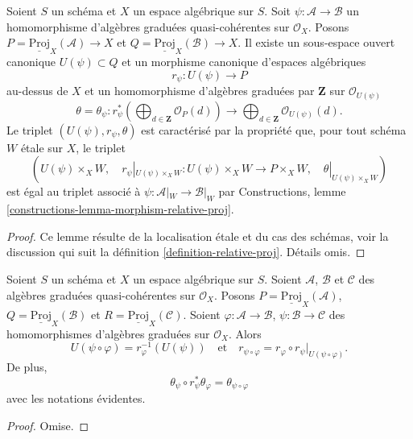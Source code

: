 \begin{lemma}
\label{lemma-morphism-relative-proj}
Soient $S$ un schéma et $X$ un espace algébrique sur $S$.
Soit $\psi : \mathcal{A} \to \mathcal{B}$ un homomorphisme
d'algèbres graduées quasi-cohérentes sur $\mathcal{O}_X$. Posons
$P = \underline{\text{Proj}}_X(\mathcal{A}) \to X$ et
$Q = \underline{\text{Proj}}_X(\mathcal{B}) \to X$.
Il existe un sous-espace ouvert canonique
$U(\psi) \subset Q$ et un morphisme canonique
d'espaces algébriques
$$
r_\psi :
U(\psi)
\longrightarrow
P
$$
au-dessus de $X$ et un homomorphisme d'algèbres graduées par $\mathbf{Z}$ sur $\mathcal{O}_{U(\psi)}$
$$
\theta = \theta_\psi :
r_\psi^*\left(
\bigoplus\nolimits_{d \in \mathbf{Z}} \mathcal{O}_P(d)
\right)
\longrightarrow
\bigoplus\nolimits_{d \in \mathbf{Z}} \mathcal{O}_{U(\psi)}(d).
$$
Le triplet $(U(\psi), r_\psi, \theta)$ est caractérisé par la propriété
que, pour tout schéma $W$ \'etale sur $X$, le triplet
$$
(U(\psi) \times_X W,\quad
r_\psi|_{U(\psi) \times_X W} : U(\psi) \times_X W \to  P \times_X W,\quad
\theta|_{U(\psi) \times_X W})
$$
est égal au triplet associé à $\psi : \mathcal{A}|_W \to \mathcal{B}|_W$
par Constructions, lemme \ref{constructions-lemma-morphism-relative-proj}.
\end{lemma}

\begin{proof}
Ce lemme résulte de la localisation \'etale et du cas des schémas, voir la
discussion qui suit la
définition \ref{definition-relative-proj}. Détails omis.
\end{proof}

\begin{lemma}
\label{lemma-morphism-relative-proj-transitive}
Soient $S$ un schéma et $X$ un espace algébrique sur $S$.
Soient $\mathcal{A}$, $\mathcal{B}$ et $\mathcal{C}$ des
algèbres graduées quasi-cohérentes sur $\mathcal{O}_X$.
Posons $P = \underline{\text{Proj}}_X(\mathcal{A})$,
$Q = \underline{\text{Proj}}_X(\mathcal{B})$ et
$R = \underline{\text{Proj}}_X(\mathcal{C})$.
Soient $\varphi : \mathcal{A} \to \mathcal{B}$,
$\psi : \mathcal{B} \to \mathcal{C}$ des homomorphismes d'algèbres graduées sur $\mathcal{O}_X$.
Alors
$$
U(\psi \circ \varphi) = r_\varphi^{-1}(U(\psi))
\quad
\text{et}
\quad
r_{\psi \circ \varphi}
=
r_\varphi \circ r_\psi|_{U(\psi \circ \varphi)}.
$$
De plus,
$$
\theta_\psi \circ r_\psi^*\theta_\varphi
=
\theta_{\psi \circ \varphi}
$$
avec les notations évidentes.
\end{lemma}

\begin{proof}
Omise.
\end{proof}

